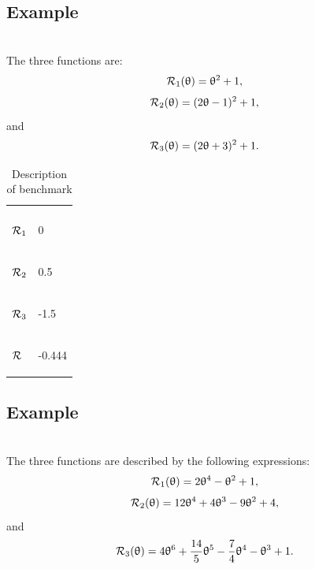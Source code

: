 \documentclass[article,authoryear,jmlmc]{beg_32}             %
\begin{document}
\subsection{Example \exFive}
~~\\
The three functions are:
\begin{equation*}
	\mathcal{R}_1(\uptheta) = \uptheta^2+1,
\end{equation*}
\begin{equation*}
	\mathcal{R}_2(\uptheta) = (2\uptheta-1)^2+1,
\end{equation*}
and
\begin{equation*}
	\mathcal{R}_3(\uptheta) = (2\uptheta+3)^2+1.
\end{equation*}

\begin{table}[h!]
	\centering
	\caption{Description of benchmark \exFive}
	\begin{tabular}{ll}
		
		\begin{bf} \diagbox{Functions}{Minimums} \end{bf} & \begin{bf}\mg\end{bf} \\ 
		
		\begin{bf}$\mathcal{R}_1$\end{bf} & 0 \\ 
		\begin{bf}$\mathcal{R}_2$\end{bf} & 0.5  \\ 
		\begin{bf}$\mathcal{R}_3$\end{bf} & -1.5  \\ 
		\begin{bf}$\mathcal{R}$\end{bf}   & -0.444  \\ 
	\end{tabular}
	\label{ex5_example}
\end{table}

\subsection{Example \exSix}
~~\\
The three functions are described by the following expressions:
\begin{equation*}
	\mathcal{R}_1(\uptheta) = 2\uptheta^4-\uptheta^2+1,
\end{equation*}
\begin{equation*}
	\mathcal{R}_2(\uptheta) = 12\uptheta^4+4\uptheta^3-9\uptheta^2+4,
\end{equation*}
and
\begin{equation*}
	\mathcal{R}_3(\uptheta) = 4\uptheta^6+\frac{14}{5}\uptheta^5-\frac{7}{4}\uptheta^4-\uptheta^3+1.
\end{equation*}
\end{document}
